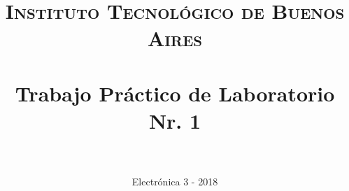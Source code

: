 

\title{
	\normalfont \normalsize \textsc{Instituto Tecnológico de Buenos Aires} \\ [25pt]
	\horrule{2pt} \\[0.4cm]
	\huge Trabajo Práctico de Laboratorio Nr. 1 \\
	\horrule{2pt} \\[0cm]
}
\author{
	\normalfont \normalsize
	Electrónica 3 - 2018 \\[0pt]		\normalsize
}
\date{}




\maketitle



% 

%
%



